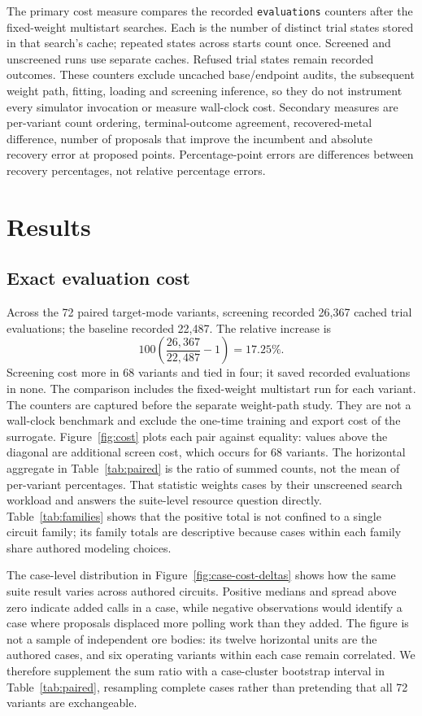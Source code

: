 \documentclass[10pt]{article}
\begin{document}
The primary cost measure compares the recorded \texttt{evaluations} counters after the fixed-weight multistart searches. Each is the number of distinct trial states stored in that search's cache; repeated states across starts count once. Screened and unscreened runs use separate caches. Refused trial states remain recorded outcomes. These counters exclude uncached base/endpoint audits, the subsequent weight path, fitting, loading and screening inference, so they do not instrument every simulator invocation or measure wall-clock cost. Secondary measures are per-variant count ordering, terminal-outcome agreement, recovered-metal difference, number of proposals that improve the incumbent and absolute recovery error at proposed points. Percentage-point errors are differences between recovery percentages, not relative percentage errors.

\section{Results}
\subsection{Exact evaluation cost}
Across the 72 paired target-mode variants, screening recorded 26,367 cached trial evaluations; the baseline recorded 22,487. The relative increase is
\begin{equation}
100\left(\frac{26{,}367}{22{,}487}-1\right)=17.25\%.
\end{equation}
Screening cost more in 68 variants and tied in four; it saved recorded evaluations in none. The comparison includes the fixed-weight multistart run for each variant. The counters are captured before the separate weight-path study. They are not a wall-clock benchmark and exclude the one-time training and export cost of the surrogate.
Figure~\ref{fig:cost} plots each pair against equality: values above the diagonal are additional screen cost, which occurs for 68 variants. The horizontal aggregate in Table~\ref{tab:paired} is the ratio of summed counts, not the mean of per-variant percentages. That statistic weights cases by their unscreened search workload and answers the suite-level resource question directly. Table~\ref{tab:families} shows that the positive total is not confined to a single circuit family; its family totals are descriptive because cases within each family share authored modeling choices.

The case-level distribution in Figure~\ref{fig:case-cost-deltas} shows how the same suite result varies across authored circuits. Positive medians and spread above zero indicate added calls in a case, while negative observations would identify a case where proposals displaced more polling work than they added. The figure is not a sample of independent ore bodies: its twelve horizontal units are the authored cases, and six operating variants within each case remain correlated. We therefore supplement the sum ratio with a case-cluster bootstrap interval in Table~\ref{tab:paired}, resampling complete cases rather than pretending that all 72 variants are exchangeable.
\end{document}
